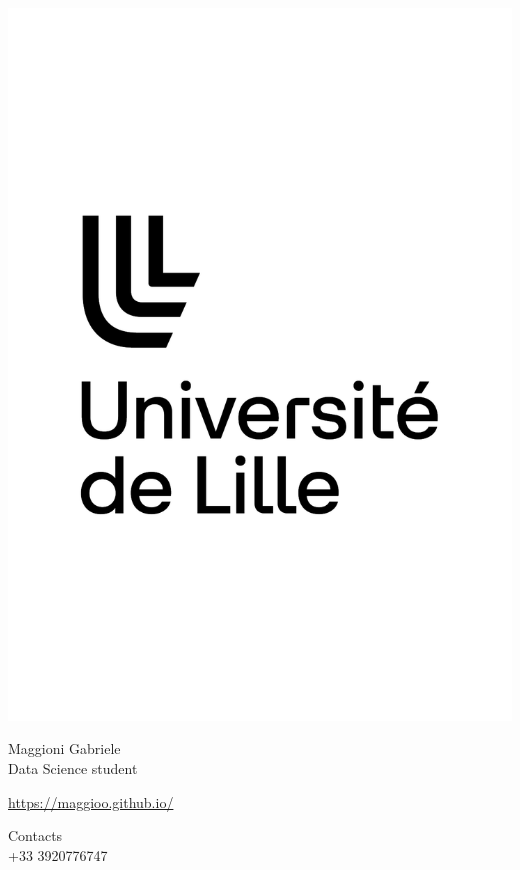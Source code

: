 \documentclass{article}
\begin{document}
\centering \includegraphics[width=.25\linewidth]{logo}\\[5pt]
\parbox{2in}{\Large \centering Maggioni Gabriele\\[1pt]
\normalsize Data Science student}

\vfill
\raggedright
\begin{multicols}{2}
\url{https://maggioo.github.io/}

\columnbreak
\raggedleft
Contacts\\
+33 3920776747%
\end{multicols}%
\end{document}
